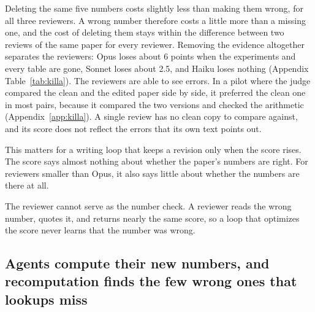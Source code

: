 Deleting the same five numbers costs slightly less than making them wrong, for all three reviewers. A wrong number
therefore costs a little more than a missing one, and the cost of deleting them stays within the difference between
two reviews of the same paper for every reviewer. Removing the evidence altogether separates the reviewers: Opus loses about 6 points when the
experiments and every table are gone, Sonnet loses about 2.5, and Haiku loses nothing (Appendix Table~\ref{tab:killa}).
The reviewers are able to see errors. In a pilot where the judge compared the clean and the edited paper side by side,
it preferred the clean one in most pairs, because it compared the two versions and checked the arithmetic
(Appendix~\ref{app:killa}). A single review has no clean copy to compare against, and its score does not reflect the
errors that its own text points out.

This matters for a writing loop that keeps a revision only when the score rises. The score says almost nothing about
whether the paper's numbers are right. For reviewers smaller than Opus, it also says little about whether the numbers
are there at all.

\begin{finding}
The reviewer cannot serve as the number check. A reviewer reads the wrong number, quotes it, and returns nearly the
same score, so a loop that optimizes the score never learns that the number was wrong.
\end{finding}

\subsection{Agents compute their new numbers, and recomputation finds the few wrong ones that lookups miss}
\label{sec:checkers}

